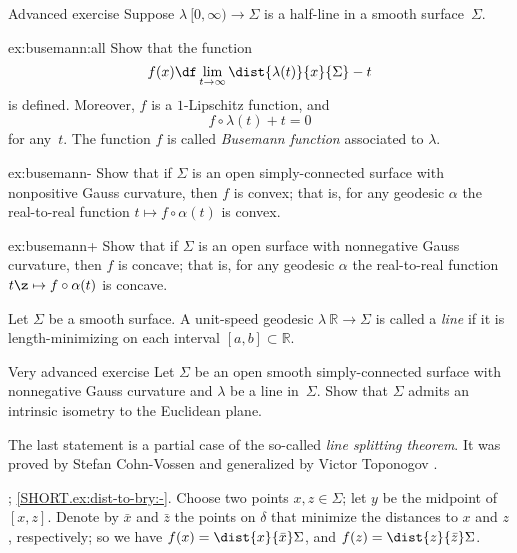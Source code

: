 \begin{thm}{Advanced exercise}\label{ex:busemann}
Suppose $\lambda\:[0,\infty)\to \Sigma$ is a half-line in a smooth surface~$\Sigma$.

\begin{subthm}{ex:busemann:all}
Show that the function 
\[f(x)\df\lim_{t\to\infty}\dist{\lambda(t)}{x}{\Sigma}- t\]
is defined.
Moreover, 
$f$ is a $1$-Lipschitz function, and
\[f\circ\lambda(t)+t=0\] 
for any~$t$.
The function $f$ is called \emph{Busemann function} associated to $\lambda$.
\end{subthm}

\begin{subthm}{ex:busemann-}
Show that if $\Sigma$ is an open simply-connected surface with nonpositive Gauss curvature, then $f$ is convex;
that is, for any geodesic $\alpha$ the real-to-real function 
$t\mapsto f\circ\alpha(t)$ is convex.
\end{subthm}

\begin{subthm}{ex:busemann+}
Show that if $\Sigma$ is an open surface with nonnegative Gauss curvature, then $f$ is concave;
that is, for any geodesic $\alpha$ the real-to-real function 
$t\z\mapsto f\circ\alpha(t)$ is concave.
\end{subthm}

\end{thm}

Let $\Sigma$ be a smooth surface.
A unit-speed geodesic $\lambda\:\mathbb{R}\to\Sigma$ is called a \emph{line} if it is length-minimizing on each interval $[a,b]\subset \mathbb{R}$.

\begin{thm}{Very advanced exercise}\label{thm:splitting}
Let $\Sigma$ be an open smooth simply-connected surface with nonnegative Gauss curvature
and $\lambda$ be a line in~$\Sigma$. 
Show that $\Sigma$ admits an intrinsic isometry to 
the Euclidean plane.
\end{thm}

The last statement is a partial case of the so-called {}\emph{line splitting theorem}. 
It was proved by Stefan Cohn-Vossen \cite[Satz 5 in][]{convossen} and generalized by Victor Toponogov \cite{toponogov-globalization+splitting}.


\parbf{\ref{ex:dist-to-bry}}; \ref{SHORT.ex:dist-to-bry:-}.
Choose two points $x,z\in\Sigma$;
let $y$ be the midpoint of $[x,z]$.
Denote by $\bar x$ and $\bar z$ the points on $\delta$ that minimize the distances to $x$ and $z$, respectively;
so we have
$f(x)
=\dist{x}{\bar x}\Sigma$,
and $f(z)=\dist{z}{\bar z}\Sigma$.

